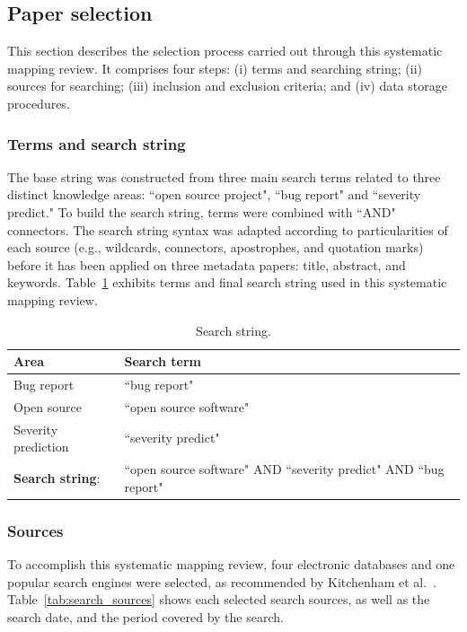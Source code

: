 \subsection{Paper selection}\label{subsec:selection}
This section describes the selection process carried out through this systematic mapping review. It comprises four steps: (i) terms and searching string; (ii) sources for searching; (iii) inclusion and exclusion criteria; and (iv) data storage procedures.

\subsubsection{Terms and search string}\label{subsubsec:string}
The base string was constructed from three main search terms related to three distinct knowledge areas: ``open source project", ``bug report" and ``severity predict." To build the search string, terms were combined with ``AND" connectors. The search string syntax was adapted according to particularities of each source (e.g., wildcards, connectors, apostrophes, and quotation marks) before it has been applied on three metadata papers: title, abstract, and keywords. Table~\ref{tab:search_string} exhibits terms and final search string used in this systematic mapping review.

\begin{table}[ht!]
  \centering
  \caption{Search string.}
  \begin{tabular}{@{}ll@{}} 
    \toprule
    \textbf{Area} & \textbf{Search term}\\ 
    \midrule
    Bug report & ``bug report"\\ 
    Open source & ``open source software" \\
    Severity prediction & ``severity predict"\\ 
    \midrule
    \textbf{Search string}: & ``open source software" AND ``severity predict" AND ``bug report"\\ 
    \bottomrule
  \end{tabular}
  \label{tab:search_string}
\end{table}

\subsubsection{Sources}\label{subsubsec:sources}
To accomplish this systematic mapping review, four electronic databases and one popular search engines were selected, as recommended by Kitchenham et al.~\cite{Kitchenham:2007}. Table~\ref{tab:search_sources} shows each selected search sources, as well as the search date, and the period covered by the search. 

